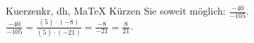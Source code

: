 \begin{MAufgabe}{Kuerzen}{kr, dh, MaTeX}
K\"urzen Sie soweit m\"oglich: $\frac{-40}{-105}$.\\ 
\ifLsg\MLoesung
\quad $\frac{-40}{-105}=\frac{(5)\cdot(-8)}{(5)\cdot(-21)}=\frac{-8}{-21}=\frac{8}{21}$.\else\relax\fi
 \end{MAufgabe}
